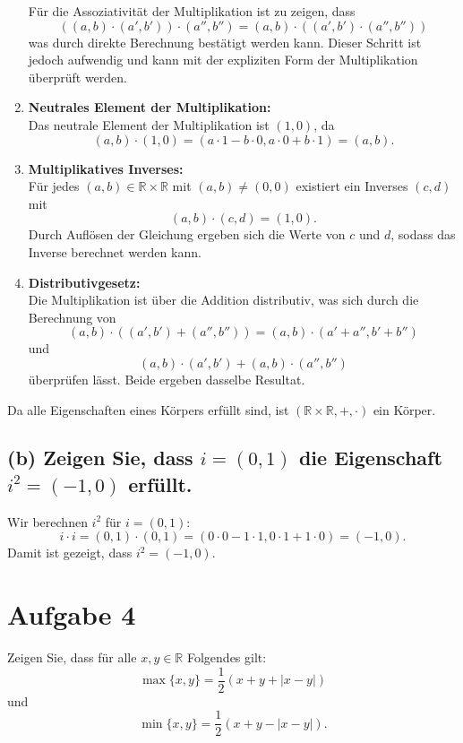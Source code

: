 \documentclass[11pt]{article}
\begin{document}
\begin{enumerate}
   Für die Assoziativität der Multiplikation ist zu zeigen, dass
   \[
   ((a, b) \cdot (a', b')) \cdot (a'', b'') = (a, b) \cdot ((a', b') \cdot (a'', b''))
   \]
   was durch direkte Berechnung bestätigt werden kann. Dieser Schritt ist jedoch aufwendig und kann mit der expliziten Form der Multiplikation überprüft werden.

   \item \textbf{Neutrales Element der Multiplikation:} \\
   Das neutrale Element der Multiplikation ist \( (1, 0) \), da
   \[
   (a, b) \cdot (1, 0) = (a \cdot 1 - b \cdot 0, a \cdot 0 + b \cdot 1) = (a, b).
   \]

   \item \textbf{Multiplikatives Inverses:} \\
   Für jedes \( (a, b) \in \mathbb{R} \times \mathbb{R} \) mit \( (a, b) \neq (0, 0) \) existiert ein Inverses \( (c, d) \) mit
   \[
   (a, b) \cdot (c, d) = (1, 0).
   \]
   Durch Auflösen der Gleichung ergeben sich die Werte von \( c \) und \( d \), sodass das Inverse berechnet werden kann.

   \item \textbf{Distributivgesetz:} \\
   Die Multiplikation ist über die Addition distributiv, was sich durch die Berechnung von
   \[
   (a, b) \cdot ((a', b') + (a'', b'')) = (a, b) \cdot (a' + a'', b' + b'')
   \]
   und
   \[
   (a, b) \cdot (a', b') + (a, b) \cdot (a'', b'')
   \]
   überprüfen lässt. Beide ergeben dasselbe Resultat.
\end{enumerate}
Da alle Eigenschaften eines Körpers erfüllt sind, ist \( (\mathbb{R} \times \mathbb{R}, +, \cdot) \) ein Körper.

\subsection*{(b) Zeigen Sie, dass \( i = (0, 1) \) die Eigenschaft \( i^2 = (-1, 0) \) erfüllt.}

Wir berechnen \( i^2 \) für \( i = (0, 1) \):
\[
i \cdot i = (0, 1) \cdot (0, 1) = (0 \cdot 0 - 1 \cdot 1, 0 \cdot 1 + 1 \cdot 0) = (-1, 0).
\]
Damit ist gezeigt, dass \( i^2 = (-1, 0) \).

   \section*{Aufgabe 4}
Zeigen Sie, dass für alle \( x, y \in \mathbb{R} \) Folgendes gilt:
\[
\max\{x, y\} = \frac{1}{2} (x + y + |x - y|)
\]
und
\[
\min\{x, y\} = \frac{1}{2} (x + y - |x - y|).
\]
\end{document}
